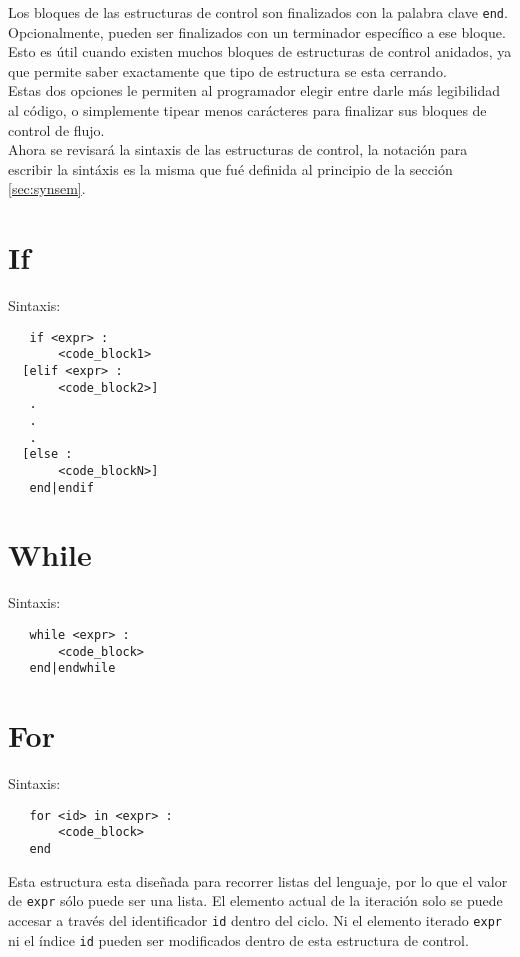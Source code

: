 \documentclass[12pt, spanish]{report}
\begin{document}
Los bloques de las estructuras de control son finalizados con la
palabra clave \texttt{end}. Opcionalmente, pueden ser finalizados con
un terminador espec\'ifico a ese bloque. Esto es \'util cuando existen
muchos bloques de estructuras de control anidados, ya que permite
saber exactamente que tipo de estructura se esta cerrando.\\

Estas dos opciones le permiten al programador elegir entre darle m\'as
legibilidad al c\'odigo, o simplemente tipear menos car\'acteres para
finalizar sus bloques de control de flujo.\\

Ahora se revisar\'a la sintaxis de las estructuras de control, la
notaci\'on para escribir la sint\'axis es la misma que fu\'e definida al
principio de la secci\'on \ref{sec:synsem}.

\section{If}
Sintaxis:
\begin{verbatim}
   if <expr> :
       <code_block1>
  [elif <expr> :
       <code_block2>]
   .
   .
   .
  [else :
       <code_blockN>]
   end|endif
\end{verbatim}

\section{While}
Sintaxis:
\begin{verbatim}
   while <expr> :
       <code_block>
   end|endwhile
\end{verbatim}


\section{For}
Sintaxis:
\begin{verbatim}
   for <id> in <expr> :
       <code_block>
   end
\end{verbatim}

Esta estructura esta dise\~nada para recorrer listas del lenguaje,
por lo que el valor de \texttt{expr} s\'olo puede ser una lista.
El elemento actual de la iteraci\'on solo se puede accesar a trav\'es
del identificador \texttt{id} dentro del ciclo. Ni el elemento iterado
\texttt{expr} ni el \'indice \texttt{id} pueden ser modificados dentro
de esta estructura de control.\\
\end{document}
